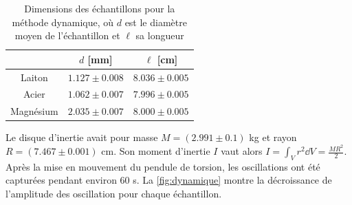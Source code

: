 \begin{table}[h]
    \centering
    \begin{tabulary}{0.9\linewidth}{c C C}
        \toprule
        & $d$ [\si{\milli\meter}] & $\ell$ [\si{\centi\meter}] \\
        \midrule
        Laiton & $1.127 \pm 0.008$ & $8.036 \pm 0.005$ \\
        Acier & $1.062 \pm 0.007$ & $7.996 \pm 0.005$ \\
        Magnésium & $2.035 \pm 0.007$ & $8.000 \pm 0.005$ \\
        \bottomrule
    \end{tabulary}
    \caption{Dimensions des échantillons pour la méthode dynamique, où $d$ est le diamètre moyen de l'échantillon et $\ell$ sa longueur}
    \label{tab:dimensions_echantillons_dynamique}
\end{table}

Le disque d'inertie avait pour masse $M=(2.991 \pm 0.1)$ \si{\kilo\gram} et rayon $R=(7.467 \pm 0.001)$ \si{\centi\meter}. Son moment d'inertie $I$ vaut alors $I=\int_V r^2 \dd V = \frac{MR^2}{2}$. Après la mise en mouvement du pendule de torsion, les oscillations ont été capturées pendant environ 60 \si{\second}. La \autoref{fig:dynamique} montre la décroissance de l'amplitude des oscillation pour chaque échantillon.

